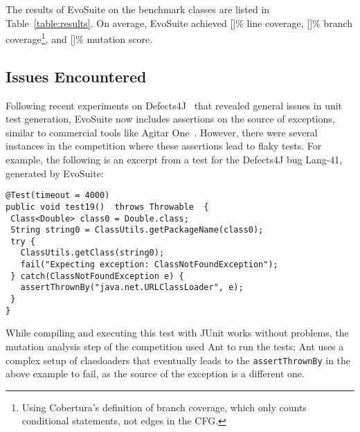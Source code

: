 \documentclass[10pt,conference,compsocconf]{IEEEtran}
\newcommand{\EVOSUITE}{{\sc EvoSuite}\xspace}
\begin{document}
\begin{table*}[t]
  \centering
  \caption{\label{table:results}Detailed results of \EVOSUITE on the SBST benchmark classes. Time is expressed in minutes.}
{}
\end{table*}



The results of \EVOSUITE on the benchmark classes are listed in
Table~\ref{table:results}. On average, \EVOSUITE achieved []\% line
coverage, []\% branch coverage\footnote{Using Cobertura's definition
  of branch coverage, which only counts conditional statements, not
  edges in the CFG.}, and []\% mutation score. 
 


\subsection{Issues Encountered}

Following recent experiments on
Defects4J~\cite{shamshiri2015automatically} that revealed general
issues in unit test generation, \EVOSUITE now includes assertions on
the source of exceptions, similar to commercial tools like Agitar
One~\cite{agitarone}. However, there were several instances in the
competition where these assertions lead to flaky tests. For example,
the following is an excerpt from a test for the Defects4J bug Lang-41,
generated by \EVOSUITE:

\begin{lstlisting}
@Test(timeout = 4000)
public void test19()  throws Throwable  {
 Class<Double> class0 = Double.class;
 String string0 = ClassUtils.getPackageName(class0);
 try { 
   ClassUtils.getClass(string0);
   fail("Expecting exception: ClassNotFoundException"); 
 } catch(ClassNotFoundException e) {
   assertThrownBy("java.net.URLClassLoader", e);
 }
}
\end{lstlisting}

While compiling and executing this test with JUnit works without
problems, the mutation analysis step of the competition used Ant to
run the tests; Ant uses a complex setup of classloaders that
eventually leads to the \texttt{assertThrownBy} in the above example
to fail, as the source of the exception is a different one.
\end{document}
